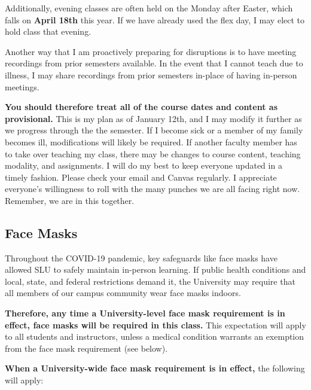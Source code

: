 \documentclass[
]{book}
\begin{document}
Additionally, evening classes are often held on the Monday after Easter, which falls on \textbf{April 18th} this year. If we have already used the flex day, I may elect to hold class that evening.

Another way that I am proactively preparing for disruptions is to have meeting recordings from prior semesters available. In the event that I cannot teach due to illness, I may share recordings from prior semesters in-place of having in-person meetings.

\textbf{You should therefore treat all of the course dates and content as provisional.} This is my plan as of January 12th, and I may modify it further as we progress through the the semester. If I become sick or a member of my family becomes ill, modifications will likely be required. If another faculty member has to take over teaching my class, there may be changes to course content, teaching modality, and assignments. I will do my best to keep everyone updated in a timely fashion. Please check your email and Canvas regularly. I appreciate everyone's willingness to roll with the many punches we are all facing right now. Remember, we are in this together.

\hypertarget{face-masks}{%
\subsection{Face Masks}\label{face-masks}}

Throughout the COVID-19 pandemic, key safeguards like face masks have allowed SLU to safely maintain in-person learning. If public health conditions and local, state, and federal restrictions demand it, the University may require that all members of our campus community wear face masks indoors.

\textbf{Therefore, any time a University-level face mask requirement is in effect, face masks will be required in this class.} This expectation will apply to all students and instructors, unless a medical condition warrants an exemption from the face mask requirement (see below).

\textbf{When a University-wide face mask requirement is in effect,} the following will apply:
\end{document}
